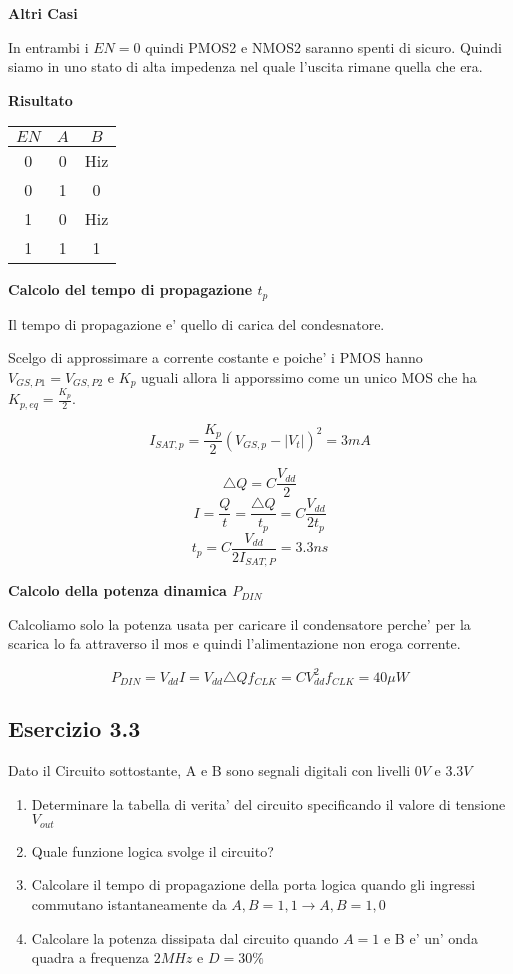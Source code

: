 \documentclass[\main/main.tex]{subfiles}
\begin{document}
\textbf{Altri Casi}

In entrambi i $EN = 0$ quindi PMOS2 e NMOS2 saranno spenti di sicuro.
Quindi siamo in uno stato di alta impedenza nel quale l'uscita rimane quella che era.

\textbf{Risultato}
\begin{center}
	\begin{tabular}{ c  c | c}
		$EN$ & $A$ & $B$ \\
		\hline
		0    & 0   & Hiz \\
		0    & 1   & 0   \\
		1    & 0   & Hiz \\
		1    & 1   & 1   \\
	\end{tabular}
\end{center}

\textbf{Calcolo del tempo di propagazione $t_p$}

Il tempo di propagazione e' quello di carica del condesnatore.

Scelgo di approssimare a corrente costante e poiche' i PMOS hanno $V_{GS,P1} = V_{GS,P2}$ e $K_p$ uguali allora li apporssimo come un unico MOS che ha $K_{p,eq} =  \frac{K_p}{2}$.

\[I_{SAT,p} = \frac{K_p}{2} \left( V_{GS,p} - |V_t| \right)^2 = 3mA\]

\[ \triangle Q = C \frac{V_{dd}}{2} \]
\[ I = \frac{Q}{t} = \frac{\triangle Q}{t_p} = C \frac{V_{dd}}{2 t_p} \]
\[ t_p = C \frac{V_{dd}}{2 I_{SAT,P}} = 3.3ns\]

\textbf{Calcolo della potenza dinamica $P_{DIN}$}

Calcoliamo solo la potenza usata per caricare il condensatore perche' per la scarica lo fa attraverso il mos e quindi l'alimentazione non eroga corrente.

\[P_{DIN} = V_{dd} I = V_{dd} \triangle Q f_{CLK} = C V_{dd}^2 f_{CLK} = 40 \mu W\]

\clearpage
\subsection{Esercizio 3.3}
Dato il Circuito sottostante, A e B sono segnali digitali con livelli $0V$ e $3.3V$

\begin{enumerate}
	\item Determinare la tabella di verita' del circuito specificando il valore di tensione $V_{out}$
	\item Quale funzione logica svolge il circuito?
	\item Calcolare il tempo di propagazione della porta logica quando gli ingressi commutano istantaneamente da  $A,B = 1,1 \longrightarrow A,B = 1,0$
	\item Calcolare la potenza dissipata dal circuito quando $A=1$ e B e' un' onda quadra a frequenza $2MHz$ e $D=30\%$
\end{enumerate}
\end{document}

